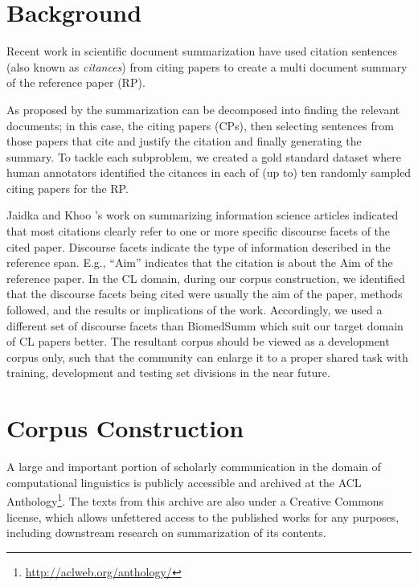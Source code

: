 \documentclass[11pt]{article}
\begin{document}
\section{Background}
Recent work \cite{mohammad2009,abu2011} in scientific document
summarization have used citation sentences (also known as {\it
  citances}) from citing papers to create a multi document summary of
the reference paper (RP).

As proposed by \cite{vu2010,hoang2010} the summarization can be
decomposed into finding the relevant documents; in this case, the
citing papers (CPs), then selecting sentences from those papers that
cite and justify the citation and finally generating the summary. To
tackle each subproblem, we created a gold standard dataset where human
annotators identified the citances in each of (up to) ten randomly sampled
citing papers for the RP.


Jaidka and Khoo 's work on summarizing
information science articles indicated that most citations clearly
refer to one or more specific discourse facets of the cited paper. 
Discourse facets indicate the type of information described in the 
reference span. E.g., ``Aim'' indicates that the citation is about the 
Aim of the reference paper. In the CL domain, during our corpus 
construction, we identified that the discourse facets being cited 
were usually the aim of the paper, methods followed, and the results 
or implications of the work. Accordingly, we used a different set of 
discourse facets than BiomedSumm which suit our target domain of CL 
papers better. The resultant corpus should be viewed as a development 
corpus only, such that the community can enlarge it to a proper shared 
task with training, development and testing set divisions in the near 
future.


\section{Corpus Construction}
\label{corpus}
A large and important portion of scholarly communication in the domain
of computational linguistics is publicly accessible and archived at
the ACL Anthology\footnote{\url{http://aclweb.org/anthology/}}.  The
texts from this archive are also under a Creative Commons license,
which allows unfettered access to the published works for any
purposes, including downstream research on summarization of its
contents.  
\end{document}
